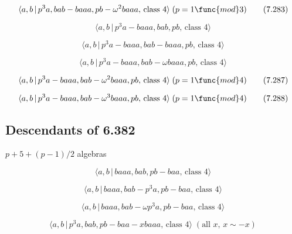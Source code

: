 \documentclass[10pt]{article}
\begin{document}
\begin{equation}
\langle a,b\,|\,p^{3}a,bab-baaa,pb-\omega ^{2}baaa,\,\text{class }4\rangle
\;(p=1\func{mod}3)  \tag{7.283}
\end{equation}

\begin{equation}
\langle a,b\,|\,p^3a-baaa,bab,pb,\,\text{class }4\rangle  \tag{7.284}
\end{equation}

\begin{equation}
\langle a,b\,|\,p^3a-baaa,bab-baaa,pb,\,\text{class }4\rangle  \tag{7.285}
\end{equation}

\begin{equation}
\langle a,b\,|\,p^{3}a-baaa,bab-\omega baaa,pb,\,\text{class }4\rangle 
\tag{7.286}
\end{equation}

\begin{equation}
\langle a,b\,|\,p^{3}a-baaa,bab-\omega ^{2}baaa,pb,\,\text{class }4\rangle
\;(p=1\func{mod}4)  \tag{7.287}
\end{equation}

\begin{equation}
\langle a,b\,|\,p^{3}a-baaa,bab-\omega ^{3}baaa,pb,\,\text{class }4\rangle
\;(p=1\func{mod}4)  \tag{7.288}
\end{equation}

\subsection{Descendants of 6.382}

$p+5+(p-1)/2$ algebras

\begin{equation}
\langle a,b\,|\,baaa,bab,pb-baa,\,\text{class }4\rangle  \tag{7.289}
\end{equation}

\begin{equation}
\langle a,b\,|\,baaa,bab-p^3a,pb-baa,\,\text{class }4\rangle  \tag{7.290}
\end{equation}

\begin{equation}
\langle a,b\,|\,baaa,bab-\omega p^{3}a,pb-baa,\,\text{class }4\rangle 
\tag{7.291}
\end{equation}

\begin{equation}
\langle a,b\,|\,p^{3}a,bab,pb-baa-xbaaa,\,\text{class }4\rangle \;(\text{all 
}x,\,x\sim -x)  \tag{7.292}
\end{equation}
\end{document}
